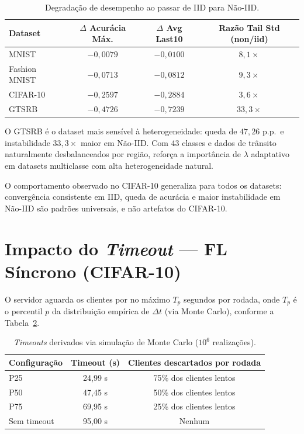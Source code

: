 \documentclass[12pt, a4paper]{article}
\begin{document}
\begin{table}[H]
\centering
\caption{Degradação de desempenho ao passar de IID para Não-IID.}
\label{tab:delta_datasets}
\renewcommand{\arraystretch}{1.25}
\begin{tabular}{lccc}
\toprule
\textbf{Dataset} & \textbf{$\Delta$ Acurácia Máx.} & \textbf{$\Delta$ Avg Last10} & \textbf{Razão Tail Std (non/iid)} \\
\midrule
MNIST         & $-0{,}0079$ & $-0{,}0100$ & $8{,}1\times$  \\
Fashion MNIST & $-0{,}0713$ & $-0{,}0812$ & $9{,}3\times$  \\
CIFAR-10      & $-0{,}2597$ & $-0{,}2884$ & $3{,}6\times$  \\
GTSRB         & $-0{,}4726$ & $-0{,}7239$ & $33{,}3\times$ \\
\bottomrule
\end{tabular}
\end{table}

O GTSRB é o dataset mais sensível à heterogeneidade: queda de $47{,}26$ p.p.\ e
instabilidade $33{,}3\times$ maior em Não-IID. Com 43 classes e dados de trânsito
naturalmente desbalanceados por região, reforça a importância de $\lambda$ adaptativo
em datasets multiclasse com alta heterogeneidade natural.

O comportamento observado no CIFAR-10 generaliza para todos os datasets:
convergência consistente em IID, queda de acurácia e maior instabilidade em Não-IID
são padrões universais, e não artefatos do CIFAR-10.

\section{Impacto do \textit{Timeout} — FL Síncrono (CIFAR-10)}

O servidor aguarda os clientes por no máximo $T_p$ segundos por rodada, onde $T_p$
é o percentil $p$ da distribuição empírica de $\Delta t$ (via Monte Carlo),
conforme a Tabela~\ref{tab:timeouts}.

\begin{table}[H]
\centering
\caption{\textit{Timeouts} derivados via simulação de Monte Carlo ($10^6$ realizações).}
\label{tab:timeouts}
\renewcommand{\arraystretch}{1.25}
\begin{tabular}{lcc}
\toprule
\textbf{Configuração} & \textbf{Timeout (s)} & \textbf{Clientes descartados por rodada} \\
\midrule
P25          & 24{,}99 s & 75\% dos clientes lentos \\
P50          & 47{,}45 s & 50\% dos clientes lentos \\
P75          & 69{,}95 s & 25\% dos clientes lentos \\
Sem timeout  & 95{,}00 s & Nenhum                   \\
\bottomrule
\end{tabular}
\end{table}
\end{document}
